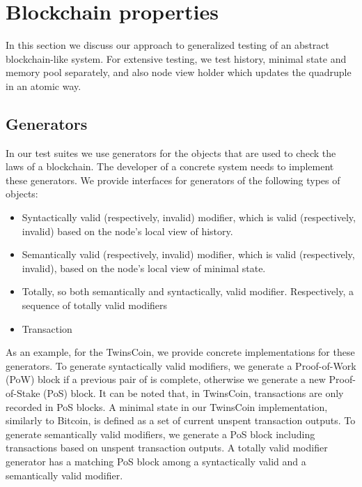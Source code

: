 
\section{Blockchain properties}
\label{sec:props}

In this section we discuss our approach to generalized testing of an abstract blockchain-like system. For extensive testing, we test history, minimal state and memory pool separately, and also node view holder which updates the quadruple {\em <history, minimal state, vault, memory pool>} in an atomic way.

\subsection{Generators}

In our test suites we use generators for the objects that are used to check the laws of a blockchain. The developer of a concrete system needs to implement these generators. We provide interfaces for generators of the following types of objects:

\begin{itemize}
	\item{Syntactically valid (respectively, invalid) modifier, which is valid (respectively, invalid) based on the node's local view of history.}
	\item{Semantically valid (respectively, invalid) modifier, which is valid (respectively, invalid), based on the node's local view of minimal state.}
	\item{Totally, so both semantically and syntactically, valid modifier. Respectively, a sequence of totally valid modifiers}
	\item{Transaction}
\end{itemize}

As an example, for the TwinsCoin, we provide concrete implementations for these generators. To generate syntactically valid modifiers, we generate a Proof-of-Work (PoW) block if a previous pair of {\em<PoW block, PoS block>} is complete, otherwise we generate a new Proof-of-Stake (PoS) block. It can be noted that, in TwinsCoin, transactions are only recorded in PoS blocks. A minimal state in our TwinsCoin implementation, similarly to Bitcoin, is defined as a set of current unspent transaction outputs. To generate semantically valid modifiers, we generate a PoS block including transactions based on unspent transaction outputs. A totally valid modifier generator has a matching PoS block among a syntactically valid and a semantically valid modifier. %

